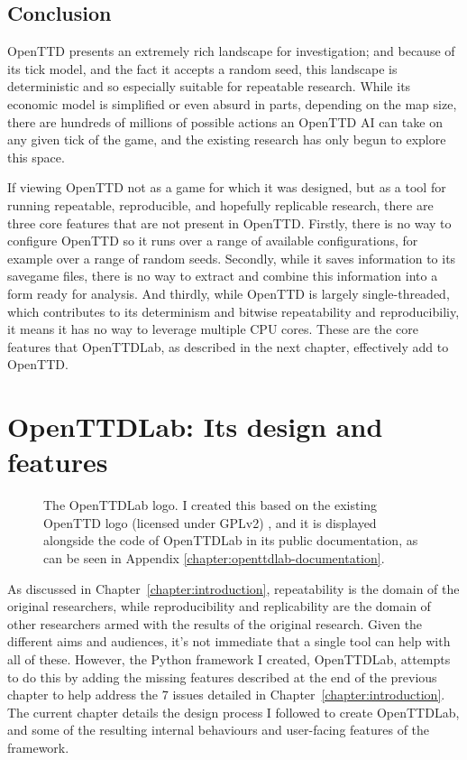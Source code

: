 \documentclass[logo,msc,dsti]{style/infthesis}    %
\begin{document}
{\section{Conclusion}

OpenTTD presents an extremely rich landscape for investigation; and because of its tick model, and the fact it accepts a random seed, this landscape is deterministic and so especially suitable for repeatable research. While its economic model is simplified or even absurd in parts, depending on the map size, there are hundreds of millions of possible actions an OpenTTD AI can take on any given tick of the game, and the existing research has only begun to explore this space.

If viewing OpenTTD not as a game for which it was designed, but as a tool for running repeatable, reproducible, and hopefully replicable research, there are three core features that are not present in OpenTTD. Firstly, there is no way to configure OpenTTD so it runs over a range of available configurations, for example over a range of random seeds. Secondly, while it saves information to its savegame files, there is no way to extract and combine this information into a form ready for analysis. And thirdly, while OpenTTD is largely single-threaded, which contributes to its determinism and bitwise repeatability and reproducibiliy, it means it has no way to leverage multiple CPU cores. These are the core features that OpenTTDLab, as described in the next chapter, effectively add to OpenTTD.

\chapter{OpenTTDLab: Its design and features}
\label{chapter:openttdlab-design-process-and-features}

\begin{figure}[H]
\centering

\caption{The OpenTTDLab logo. I created this based on the existing OpenTTD logo (licensed under GPLv2) \cite{OpenTTDLogo}, and it is displayed alongside the code of OpenTTDLab in its public documentation, as can be seen in Appendix \ref{chapter:openttdlab-documentation}.}
\label{fig:openttlab-logo}
\end{figure}

As discussed in Chapter~\ref{chapter:introduction}, repeatability is the domain of the original researchers, while reproducibility and replicability are the domain of other researchers armed with the results of the original research. Given the different aims and audiences, it's not immediate that a single tool can help with all of these. However, the Python framework I created, OpenTTDLab, attempts to do this by adding the missing features described at the end of the previous chapter to help address the 7 issues detailed in Chapter~\ref{chapter:introduction}. The current chapter details the design process I followed to create OpenTTDLab, and some of the resulting internal behaviours and user-facing features of the framework.

}
\end{document}
